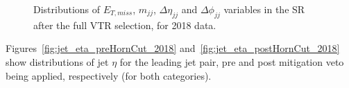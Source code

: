 \begin{figure}[htbp]
{    }
  \caption{Distributions of $E_{T,miss}$, $m_{jj}$, $\Delta\eta_{jj}$ and $\Delta\phi_{jj}$ variables in the SR after the full VTR selection, for 2018 data.}
  \label{fig:2018_VTR_SR_motivation_1}
\end{figure}

\newpage

\hspace{10pt} Figures~\ref{fig:jet_eta_preHornCut_2018} and~\ref{fig:jet_eta_postHornCut_2018} show distributions of jet $\eta$ for the leading jet pair, pre and post mitigation veto being applied, respectively (for both categories).

